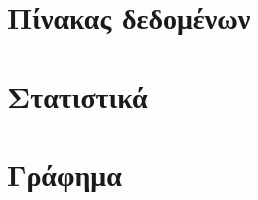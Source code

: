 \documentclass{article}
\begin{document}

\section*{Πίνακας δεδομένων}

\section*{Στατιστικά}

\section*{Γράφημα}
\end{document}
